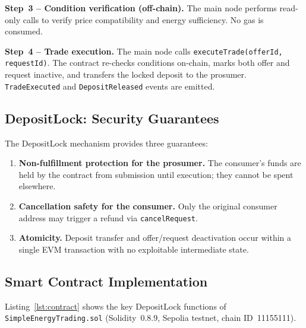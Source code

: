 \documentclass{IEEEoj}
\begin{document}
\textbf{Step~3 -- Condition verification (off-chain).}
The main node performs read-only calls to verify price compatibility and
energy sufficiency. No gas is consumed.

\textbf{Step~4 -- Trade execution.}
The main node calls \texttt{executeTrade(offerId, requestId)}.
The contract re-checks conditions on-chain, marks both offer and request
inactive, and transfers the locked deposit to the prosumer.
\texttt{TradeExecuted} and \texttt{DepositReleased} events are emitted.

\subsection{DepositLock: Security Guarantees}

The DepositLock mechanism provides three guarantees:

\begin{enumerate}
  \item \textbf{Non-fulfillment protection for the prosumer.}
        The consumer's funds are held by the contract from submission until
        execution; they cannot be spent elsewhere.

  \item \textbf{Cancellation safety for the consumer.}
        Only the original consumer address may trigger a refund via
        \texttt{cancelRequest}.

  \item \textbf{Atomicity.}
        Deposit transfer and offer/request deactivation occur within a single
        EVM transaction with no exploitable intermediate state.
\end{enumerate}

\subsection{Smart Contract Implementation}

Listing~\ref{lst:contract} shows the key DepositLock functions of
\texttt{SimpleEnergyTrading.sol} (Solidity~0.8.9, Sepolia testnet,
chain ID~11155111).
\end{document}
